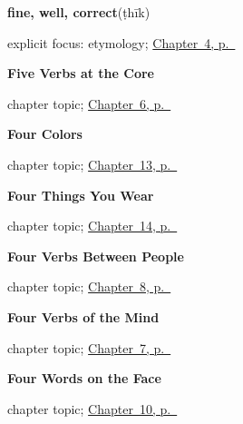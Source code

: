 \noindent\begin{minipage}[t]{\linewidth}
\raggedright
\textbf{fine, well, correct}\enspace\emph{}\enspace(ṭhīk)\par
\footnotesize explicit focus: etymology; \hyperref[ch:ur-how-are-you]{Chapter~4, p.~\pageref*{ch:ur-how-are-you}}
\end{minipage}\par\smallskip

\noindent\begin{minipage}[t]{\linewidth}
\raggedright
\textbf{Five Verbs at the Core}\par
\footnotesize chapter topic; \hyperref[ch:ur-core-verbs]{Chapter~6, p.~\pageref*{ch:ur-core-verbs}}
\end{minipage}\par\smallskip

\noindent\begin{minipage}[t]{\linewidth}
\raggedright
\textbf{Four Colors}\par
\footnotesize chapter topic; \hyperref[ch:ur-colors]{Chapter~13, p.~\pageref*{ch:ur-colors}}
\end{minipage}\par\smallskip

\noindent\begin{minipage}[t]{\linewidth}
\raggedright
\textbf{Four Things You Wear}\par
\footnotesize chapter topic; \hyperref[ch:ur-clothing]{Chapter~14, p.~\pageref*{ch:ur-clothing}}
\end{minipage}\par\smallskip

\noindent\begin{minipage}[t]{\linewidth}
\raggedright
\textbf{Four Verbs Between People}\par
\footnotesize chapter topic; \hyperref[ch:ur-social-verbs]{Chapter~8, p.~\pageref*{ch:ur-social-verbs}}
\end{minipage}\par\smallskip

\noindent\begin{minipage}[t]{\linewidth}
\raggedright
\textbf{Four Verbs of the Mind}\par
\footnotesize chapter topic; \hyperref[ch:ur-mind-verbs]{Chapter~7, p.~\pageref*{ch:ur-mind-verbs}}
\end{minipage}\par\smallskip

\noindent\begin{minipage}[t]{\linewidth}
\raggedright
\textbf{Four Words on the Face}\par
\footnotesize chapter topic; \hyperref[ch:ur-face-words]{Chapter~10, p.~\pageref*{ch:ur-face-words}}
\end{minipage}\par\smallskip

